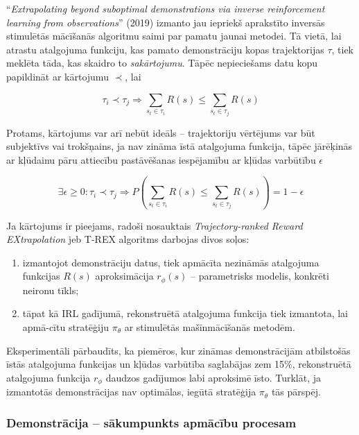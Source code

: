 \documentclass[12pt, a4paper]{article}
\numberwithin{equation}{section} %
\begin{document}
``\textit{Extrapolating beyond suboptimal demonstrations via inverse reinforcement learning from observations}'' \cite{brown2019extrapolating} (2019) izmanto jau iepriekš aprakstīto inversās stimulētās mācīšanās algoritmu saimi par pamatu jaunai metodei. Tā vietā, lai atrastu atalgojuma funkciju, kas pamato demonstrāciju kopas trajektorijas $\tau$, tiek meklēta tāda, kas skaidro to \textit{sakārtojumu}. Tāpēc nepieciešams datu kopu papildināt ar kārtojumu $\prec$, lai

\begin{equation}
    \tau_i \prec \tau_j \Rightarrow \sum_{s_t \in \tau_i}R(s) \leq \sum_{s_t \in \tau_j}R(s)
\end{equation}

Protams, kārtojums var arī nebūt ideāls -- trajektoriju vērtējums var būt subjektīvs vai trokšņains, ja nav zināma īstā atalgojuma funkcija, tāpēc jārēķinās ar kļūdainu pāru attiecību pastāvēšanas iespējamību ar kļūdas varbūtību $\epsilon$

\begin{equation}
    \exists \epsilon \geq 0 : \tau_i \prec \tau_j \Rightarrow P\left(\sum_{s_t \in \tau_i}R(s) \leq \sum_{s_t \in \tau_j}R(s)\right) = 1 - \epsilon
\end{equation}

Ja kārtojums ir pieejams, radoši nosauktais \textit{Trajectory-ranked Reward EXtrapolation} jeb T-REX algoritms darbojas divos soļos:

\begin{enumerate}
    \item izmantojot demonstrāciju datus, tiek apmācīta nezināmās atalgojuma funkcijas $R(s)$ aproksimācija $r_{\phi}(s)$ -- parametrisks modelis, konkrēti neironu tīkls;
    \item tāpat kā IRL gadījumā, rekonstruētā atalgojuma funkcija tiek izmantota, lai apmā-cītu stratēģiju $\pi_{\theta}$ ar stimulētās mašīnmācīšanās metodēm.
\end{enumerate}

Eksperimentāli pārbaudīts, ka piemēros, kur zināmas demonstrācijām atbilstošās īstās atalgojuma funkcijas un kļūdas varbūtība saglabājas zem 15\%, rekonstruētā atalgojuma funkcija $r_{\phi}$ daudzos gadījumos labi aproksimē īsto. Turklāt, ja izmantotās demonstrācijas nav optimālas, iegūtā stratēģija $\pi_{\theta}$ tās pārspēj.

\subsubsection{Demonstrācija -- sākumpunkts apmācību procesam}
\end{document}
